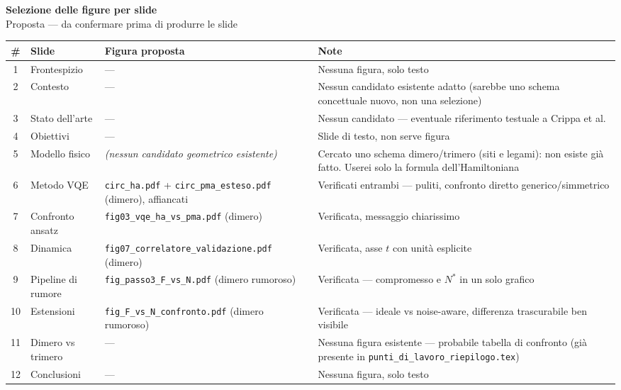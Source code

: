 \documentclass[11pt,a4paper]{article}
\begin{document}
\begin{center}
{\Large\bfseries Selezione delle figure per slide}\\[4pt]
{\normalsize Proposta --- da confermare prima di produrre le slide}
\end{center}

\vspace{10pt}

\begin{center}
\begin{tabular}{c L{2.6cm} L{6.3cm} L{4.5cm}}
\toprule
\# & Slide & Figura proposta & Note \\
\midrule
{}
1 & Frontespizio & --- & Nessuna figura, solo testo \\
2 & Contesto & --- & Nessun candidato esistente adatto (sarebbe uno schema concettuale nuovo, non una selezione) \\
3 & Stato dell'arte & --- & Nessun candidato --- eventuale riferimento testuale a Crippa et al. \\
4 & Obiettivi & --- & Slide di testo, non serve figura \\
5 & Modello fisico & \emph{(nessun candidato geometrico esistente)} & Cercato uno schema dimero/trimero (siti e legami): non esiste già fatto. Userei solo la formula dell'Hamiltoniana \\
6 & Metodo VQE & \texttt{circ\_ha.pdf} + \texttt{circ\_pma\_esteso.pdf} (dimero), affiancati & Verificati entrambi --- puliti, confronto diretto generico/simmetrico \\
\midrule
{}
7 & Confronto ansatz & \texttt{fig03\_vqe\_ha\_vs\_pma.pdf} (dimero) & Verificata, messaggio chiarissimo \\
8 & Dinamica & \texttt{fig07\_correlatore\_validazione.pdf} (dimero) & Verificata, asse $t$ con unità esplicite \\
9 & Pipeline di rumore & \texttt{fig\_passo3\_F\_vs\_N.pdf} (dimero rumoroso) & Verificata --- compromesso e $N^*$ in un solo grafico \\
10 & Estensioni & \texttt{fig\_F\_vs\_N\_confronto.pdf} (dimero rumoroso) & Verificata --- ideale vs noise-aware, differenza trascurabile ben visibile \\
11 & Dimero vs trimero & --- & Nessuna figura esistente --- probabile tabella di confronto (già presente in \texttt{punti\_di\_lavoro\_riepilogo.tex}) \\
12 & Conclusioni & --- & Nessuna figura, solo testo \\
\bottomrule
\end{tabular}
\end{center}
\end{document}
